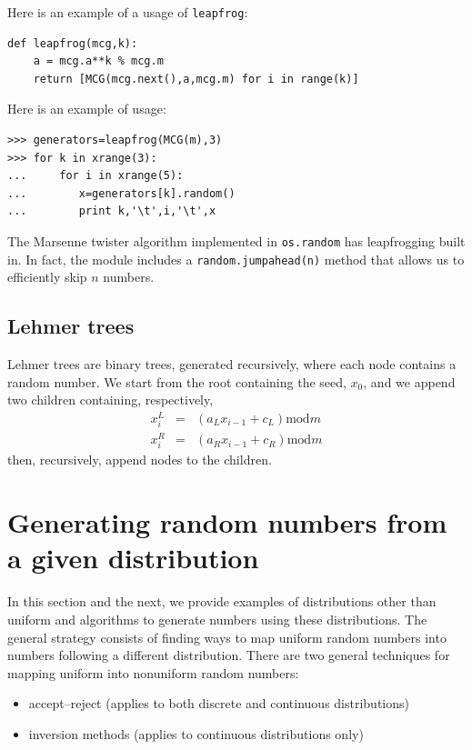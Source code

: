 \documentclass[justified,sixbynine]{tufte-book}
\def\ft{\small\tt}
\theoremstyle{plain}%
\theoremstyle{definition}
\theoremstyle{remark}
\begin{document}
\begin{fullwidth}
Here is an example of a usage of {\ft leapfrog}:

\begin{lstlisting}[caption={in file: {\ft nlib.py}}]
def leapfrog(mcg,k):
    a = mcg.a**k % mcg.m
    return [MCG(mcg.next(),a,mcg.m) for i in range(k)]
\end{lstlisting}

Here is an example of usage:
\begin{lstlisting}
>>> generators=leapfrog(MCG(m),3)
>>> for k in xrange(3):
...     for i in xrange(5):
...        x=generators[k].random()
...        print k,'\t',i,'\t',x
\end{lstlisting}

The Marsenne twister algorithm implemented in {\ft os.random} has leapfrogging built in. In fact, the module includes a {\ft random.jumpahead(n)} method that allows us to efficiently skip $n$ numbers.

\goodbreak\subsection{Lehmer trees}

Lehmer trees are binary trees, generated recursively, where each node
contains a random number. We start from the root containing the seed, $x_0$, and
we append two children containing, respectively,
\begin{eqnarray}
x_i^L &=&(a_Lx_{i-1}+c_L)\textrm{mod}m \\
x_i^R &=&(a_Rx_{i-1}+c_R)\textrm{mod}m
\end{eqnarray}
then, recursively, append nodes to the children.

\goodbreak\section{Generating random numbers from a given distribution}


In this section and the next, we provide examples of distributions other than uniform and algorithms to generate numbers using these distributions. The general strategy consists of finding ways to map uniform random numbers into numbers following a different distribution. There are two general techniques for mapping uniform into nonuniform random numbers:

\begin{itemize}
\item accept--reject (applies to both discrete and continuous distributions)
\item inversion methods (applies to continuous distributions only)
\end{itemize}


\end{fullwidth}
\end{document}
